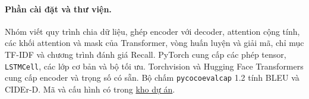 \documentclass[a4paper,11pt]{article}
\begin{document}
\paragraph{Phần cài đặt và thư viện.}
Nhóm viết quy trình chia dữ liệu, ghép encoder với decoder, attention cộng tính, các khối attention và mask của Transformer, vòng huấn luyện và giải mã, chỉ mục TF-IDF và chương trình đánh giá Recall. PyTorch cung cấp các phép tensor, \texttt{LSTMCell}, các lớp cơ bản và bộ tối ưu. Torchvision và Hugging Face Transformers cung cấp encoder và trọng số có sẵn. Bộ chấm \texttt{pycocoevalcap} 1.2 tính BLEU và CIDEr-D. Mã và cấu hình có trong \href{https://github.com/VanAnh179/Image-Captioning-DL}{kho dự án}.





\end{document}
